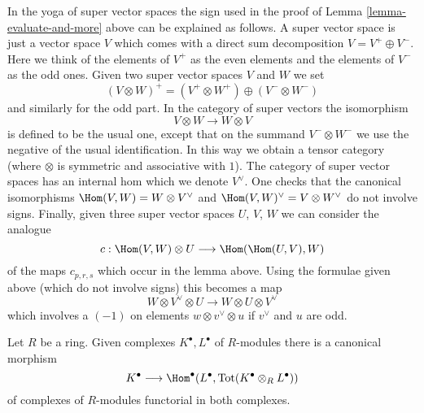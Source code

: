 \begin{remark}
\label{remark-sign-explanation}
In the yoga of super vector spaces the sign used in the proof
of Lemma \ref{lemma-evaluate-and-more} above can be explained
as follows. A super vector space is just a vector space
$V$ which comes with a direct sum decomposition $V = V^+ \oplus V^-$.
Here we think of the elements of $V^+$ as the even elements
and the elements of $V^-$ as the odd ones. Given two super
vector spaces $V$ and $W$ we set
$$
(V \otimes W)^+ = (V^+ \otimes W^+) \oplus (V^- \otimes W^-)
$$
and similarly for the odd part. In the category of super vectors the
isomorphism
$$
V \otimes W \longrightarrow W \otimes V
$$
is defined to be the usual one, except that on the summand
$V^- \otimes W^-$ we use the negative of the usual identification.
In this way we obtain a tensor category (where $\otimes$ is symmetric
and associative with $1$). The category of super vector spaces has
an internal hom which we denote $V^\vee$. One checks that the
canonical isomorphisms $\Hom(V, W) = W \otimes V^\vee$
and $\Hom(V, W)^\vee = V \otimes W^\vee$ do not involve signs.
Finally, given three super vector spaces
$U$, $V$, $W$ we can consider the analogue
$$
c : \Hom(V, W) \otimes U \longrightarrow \Hom(\Hom(U, V), W)
$$
of the maps $c_{p, r, s}$ which occur in the lemma above.
Using the formulae given above (which do not involve signs)
this becomes a map
$$
W \otimes V^\vee \otimes U
\longrightarrow
W \otimes U \otimes V^\vee
$$
which involves a $(-1)$ on elements $w \otimes v^\vee \otimes u$
if $v^\vee$ and $u$ are odd.
\end{remark}

\begin{lemma}
\label{lemma-diagonal}
Let $R$ be a ring. Given complexes $K^\bullet, L^\bullet$
of $R$-modules there is a canonical morphism
$$
K^\bullet
\longrightarrow
\Hom^\bullet(L^\bullet, \text{Tot}(K^\bullet \otimes_R L^\bullet))
$$
of complexes of $R$-modules functorial in both complexes.
\end{lemma}


